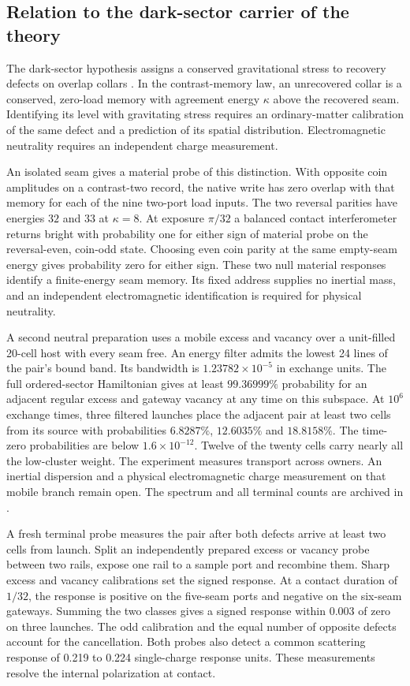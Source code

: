 \documentclass[11pt]{article}
\theoremstyle{definition}
\theoremstyle{remark}
\theoremstyle{plain}
\begin{document}
\subsection{Relation to the dark-sector carrier of the theory}

The dark-sector hypothesis assigns a conserved gravitational stress to
recovery defects on overlap collars \cite{ophdarkmatter}. In the
contrast-memory law, an unrecovered collar is a conserved, zero-load
memory with agreement energy $\kappa$ above the recovered seam.
Identifying its level with gravitating stress requires an ordinary-matter
calibration of the same defect and a prediction of its spatial distribution.
Electromagnetic neutrality requires an independent charge measurement.

An isolated seam gives a material probe of this distinction. With
opposite coin amplitudes on a contrast-two record, the native write
has zero overlap with that memory for each of the nine two-port load
inputs. The two reversal parities have energies $32$ and $33$ at
$\kappa=8$. At exposure $\pi/32$ a balanced contact interferometer
returns bright with probability one for either sign of material probe
on the reversal-even, coin-odd state. Choosing even coin parity at
the same empty-seam energy gives probability zero for either sign.
These two null material responses identify a finite-energy seam
memory. Its fixed address supplies no inertial mass, and an independent
electromagnetic identification is required for physical neutrality.


A second neutral preparation uses a mobile excess and vacancy over a
unit-filled 20-cell host with every seam free. An energy filter admits the
lowest 24 lines of the pair's bound band. Its bandwidth is
$1.23782\times10^{-5}$ in exchange units. The full ordered-sector
Hamiltonian gives at least $99.36999\%$ probability for an adjacent
regular excess and gateway vacancy at any time on this subspace.
At $10^6$ exchange times, three filtered launches place the adjacent pair
at least two cells from its source with probabilities $6.8287\%$,
$12.6035\%$ and $18.8158\%$. The time-zero probabilities are below
$1.6\times10^{-12}$. Twelve of the twenty cells carry nearly all the
low-cluster weight. The experiment measures transport across owners.
An inertial dispersion and a physical electromagnetic charge measurement
on that mobile branch remain open. The spectrum and all terminal counts
are archived in .

A fresh terminal probe measures the pair after both defects arrive at
least two cells from launch. Split an independently prepared excess or
vacancy probe between two rails, expose one rail to a sample port and
recombine them. Sharp excess and vacancy calibrations set the signed
response. At a contact duration of $1/32$, the response is positive
on the five-seam ports and negative on the six-seam gateways. Summing
the two classes gives a signed response within 0.003 of zero on three
launches. The odd calibration and the equal number of opposite defects
account for the cancellation. Both probes also detect a common
scattering response of 0.219 to 0.224 single-charge response units.
These measurements resolve the internal polarization at contact.
\end{document}
